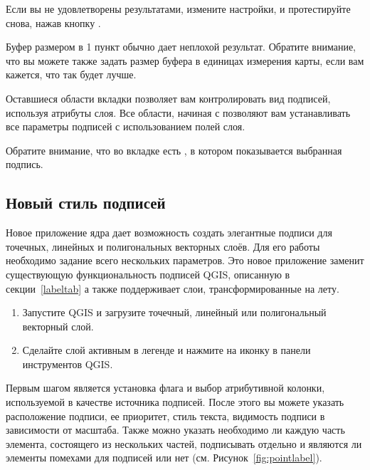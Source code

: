 Если вы не удовлетворены результатами, измените настройки, и протестируйте
снова, нажав кнопку .

Буфер размером в 1 пункт обычно дает неплохой результат. Обратите внимание,
что вы можете также задать размер буфера в единицах измерения карты, если
вам кажется, что так будет лучше.

Оставшиеся области вкладки  позволяет вам контролировать вид
подписей, используя атрибуты слоя. Все области, начиная с 
позволяют вам устанавливать все параметры подписей с использованием полей слоя.

Обратите внимание, что во вкладке  есть
, в котором показывается
выбранная подпись.

\subsection{Новый стиль подписей}\label{newlabel}

Новое приложение ядра \qg {} дает возможность
создать элегантные подписи для точечных, линейных и полигональных векторных
слоёв. Для его работы необходимо задание всего нескольких параметров.
Это новое приложение заменит существующую функциональность подписей QGIS,
описанную в секции~\ref{labeltab} а также поддерживает слои, трансформированные
на лету.


\begin{enumerate}
  \item Запустите QGIS и загрузите точечный, линейный или полигональный
  векторный слой.
  \item Сделайте слой активным в легенде и нажмите на иконку
   в панели инструментов QGIS.
\end{enumerate}


Первым шагом является установка флага 
и выбор атрибутивной колонки, используемой в качестве источника подписей.
После этого вы можете указать расположение подписи, ее приоритет, стиль
текста, видимость подписи в зависимости от масштаба. Также можно указать
необходимо ли каждую часть элемента, состоящего из нескольких частей,
подписывать отдельно и являются ли элементы помехами для подписей или нет
(см. Рисунок~\ref{fig:pointlabel}).

